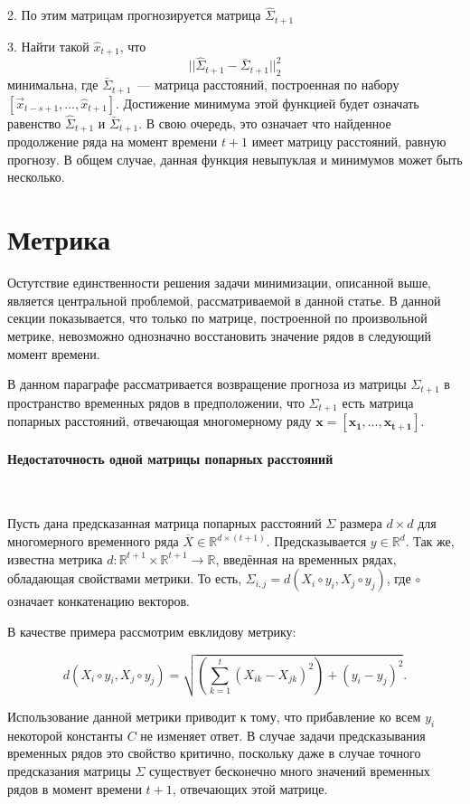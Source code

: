 \documentclass{article}
\begin{document}
2. По этим матрицам прогнозируется матрица $\hat{\Sigma}_{t+1}$

3. Найти такой $\hat{x}_{t+1}$, что \[ ||\hat{\Sigma}_{t+1} - \bar{\Sigma}_{t+1}||_2^2 \] минимальна, где $\bar{\Sigma}_{t+1}$~--- матрица расстояний, построенная по набору $[\vec{x}_{t-s+1}, \ldots, \hat{x}_{t+1}]$. Достижение минимума этой функцией будет означать равенство $\hat{\Sigma}_{t+1}$ и $\bar{\Sigma}_{t+1}$. В свою очередь, это означает что найденное продолжение ряда на момент времени $t+1$ имеет матрицу расстояний, равную прогнозу. В общем случае, данная функция невыпуклая и минимумов может быть несколько.

\section{Метрика}

Остутствие единственности решения задачи минимизации, описанной выше, является центральной проблемой, рассматриваемой в данной статье. В данной секции показывается, что только по матрице, построенной по произвольной метрике, невозможно однозначно восстановить значение рядов в следующий момент времени.

В данном параграфе рассматривается возвращение прогноза из матрицы $\Sigma_{t+1}$ в пространство временных рядов в предположении, что $\Sigma_{t+1}$ есть матрица попарных расстояний, отвечающая многомерному ряду $\mathbf{x}=[\mathbf{x_1}, \ldots, \mathbf{x_{t+1}}]$.

\paragraph{Недостаточность одной матрицы попарных расстояний}\

Пусть дана предсказанная матрица попарных расстояний $\Sigma$ размера $d \times d$ для многомерного временного ряда $\overline{X} \in \mathbb{R}^{d \times (t+1)}$. Предсказывается $y \in \mathbb{R}^d$. Так же, известна метрика $d : \mathbb{R}^{t+1} \times \mathbb{R}^{t+1} \rightarrow \mathbb{R}$, введённая на временных рядах, обладающая свойствами метрики. То есть, $\Sigma_{i,j} = d(X_i \circ y_i, X_j \circ y_j)$, где $\circ$ означает конкатенацию векторов.

В качестве примера рассмотрим евклидову метрику: 

$$d(X_i \circ y_i, X_j \circ y_j)=\sqrt{\left(\sum_{k=1}^t (X_{ik}-X_{jk})^2\right) + (y_i-y_j)^2}.$$

Использование данной метрики приводит к тому, что прибавление ко всем $y_i$ некоторой константы $C$ не изменяет ответ. В случае задачи предсказывания временных рядов это свойство критично, поскольку даже в случае точного предсказания матрицы $\Sigma$ существует бесконечно много значений временных рядов в момент времени $t+1$, отвечающих этой матрице.
\end{document}
